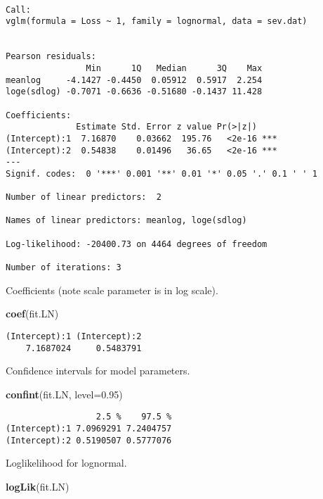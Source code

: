 \documentclass[]{book}
\newenvironment{Shaded}{\begin{snugshade}}{\end{snugshade}}
\newcommand{\KeywordTok}[1]{\textcolor[rgb]{0.13,0.29,0.53}{\textbf{#1}}}
\newcommand{\DataTypeTok}[1]{\textcolor[rgb]{0.13,0.29,0.53}{#1}}
\newcommand{\FloatTok}[1]{\textcolor[rgb]{0.00,0.00,0.81}{#1}}
\newcommand{\NormalTok}[1]{#1}
\theoremstyle{definition}
\theoremstyle{definition}
\theoremstyle{definition}
\theoremstyle{remark}
\begin{document}
\begin{verbatim}

Call:
vglm(formula = Loss ~ 1, family = lognormal, data = sev.dat)


Pearson residuals:
                Min      1Q   Median      3Q    Max
meanlog     -4.1427 -0.4450  0.05912  0.5917  2.254
loge(sdlog) -0.7071 -0.6636 -0.51680 -0.1437 11.428

Coefficients: 
              Estimate Std. Error z value Pr(>|z|)    
(Intercept):1  7.16870    0.03662  195.76   <2e-16 ***
(Intercept):2  0.54838    0.01496   36.65   <2e-16 ***
---
Signif. codes:  0 '***' 0.001 '**' 0.01 '*' 0.05 '.' 0.1 ' ' 1

Number of linear predictors:  2 

Names of linear predictors: meanlog, loge(sdlog)

Log-likelihood: -20400.73 on 4464 degrees of freedom

Number of iterations: 3 
\end{verbatim}

Coefficients (note scale parameter is in log scale).

\begin{Shaded}
\begin{Highlighting}[]
\KeywordTok{coef}\NormalTok{(fit.LN)                }
\end{Highlighting}
\end{Shaded}

\begin{verbatim}
(Intercept):1 (Intercept):2 
    7.1687024     0.5483791 
\end{verbatim}

Confidence intervals for model parameters.

\begin{Shaded}
\begin{Highlighting}[]
\KeywordTok{confint}\NormalTok{(fit.LN, }\DataTypeTok{level=}\FloatTok{0.95}\NormalTok{)   }
\end{Highlighting}
\end{Shaded}

\begin{verbatim}
                  2.5 %    97.5 %
(Intercept):1 7.0969291 7.2404757
(Intercept):2 0.5190507 0.5777076
\end{verbatim}

Loglikelihood for lognormal.

\begin{Shaded}
\begin{Highlighting}[]
\KeywordTok{logLik}\NormalTok{(fit.LN)               }
\end{Highlighting}
\end{Shaded}
\end{document}
